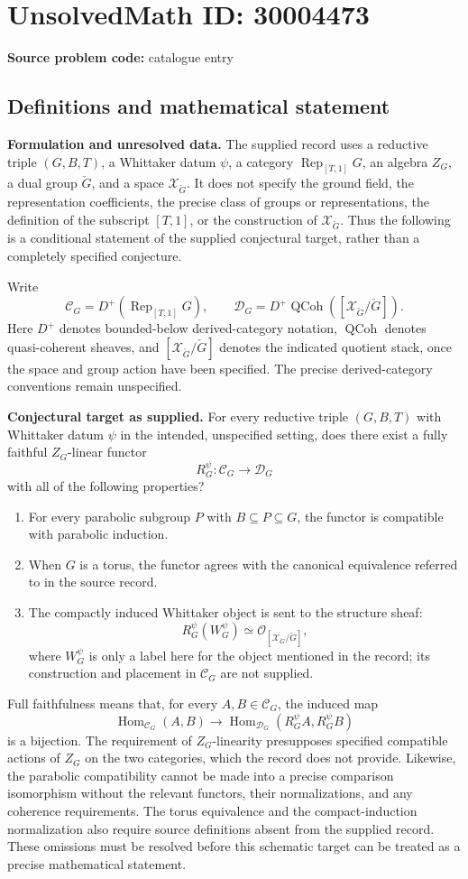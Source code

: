 \documentclass[11pt]{article}
\begin{document}
\section*{UnsolvedMath ID: 30004473}
\textbf{Source problem code:} catalogue entry
\subsection{Definitions and mathematical statement}
\textbf{Formulation and unresolved data.} The supplied record uses a reductive triple $(G,B,T)$, a Whittaker datum $\psi$, a category $\operatorname{Rep}_{[T,1]}G$, an algebra $Z_G$, a dual group $\check G$, and a space $\mathcal X_{\check G}$. It does not specify the ground field, the representation coefficients, the precise class of groups or representations, the definition of the subscript $[T,1]$, or the construction of $\mathcal X_{\check G}$. Thus the following is a conditional statement of the supplied conjectural target, rather than a completely specified conjecture.

Write
\[
\mathcal C_G=D^+(\operatorname{Rep}_{[T,1]}G),
\qquad
\mathcal D_G=D^+\operatorname{QCoh}([\mathcal X_{\check G}/\check G]).
\]
Here $D^+$ denotes bounded-below derived-category notation, $\operatorname{QCoh}$ denotes quasi-coherent sheaves, and $[\mathcal X_{\check G}/\check G]$ denotes the indicated quotient stack, once the space and group action have been specified. The precise derived-category conventions remain unspecified.

\textbf{Conjectural target as supplied.} For every reductive triple $(G,B,T)$ with Whittaker datum $\psi$ in the intended, unspecified setting, does there exist a fully faithful $Z_G$-linear functor
\[
R_G^\psi:\mathcal C_G\longrightarrow\mathcal D_G
\]
with all of the following properties?
\begin{enumerate}
\item For every parabolic subgroup $P$ with $B\subseteq P\subseteq G$, the functor is compatible with parabolic induction.
\item When $G$ is a torus, the functor agrees with the canonical equivalence referred to in the source record.
\item The compactly induced Whittaker object is sent to the structure sheaf:
\[
R_G^\psi(W_G^\psi)\simeq
\mathcal O_{[\mathcal X_{\check G}/\check G]},
\]
where $W_G^\psi$ is only a label here for the object mentioned in the record; its construction and placement in $\mathcal C_G$ are not supplied.
\end{enumerate}
Full faithfulness means that, for every $A,B\in\mathcal C_G$, the induced map
\[
\operatorname{Hom}_{\mathcal C_G}(A,B)
\longrightarrow
\operatorname{Hom}_{\mathcal D_G}(R_G^\psi A,R_G^\psi B)
\]
is a bijection. The requirement of $Z_G$-linearity presupposes specified compatible actions of $Z_G$ on the two categories, which the record does not provide. Likewise, the parabolic compatibility cannot be made into a precise comparison isomorphism without the relevant functors, their normalizations, and any coherence requirements. The torus equivalence and the compact-induction normalization also require source definitions absent from the supplied record. These omissions must be resolved before this schematic target can be treated as a precise mathematical statement.
\end{document}
